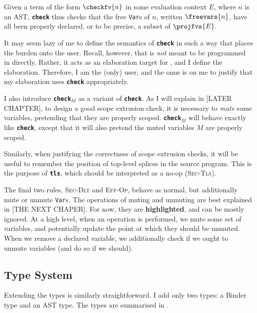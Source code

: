 Given a term of the form $\checkfv{n}$ in some evaluation context $E$, where $n$ is an AST, \textbf{\texttt{check}} thus checks that the free \texttt{Var}s of $n$, written $\freevars{n}$, have all been properly declared, or to be precise, a subset of $\projfvs{E}$. 

It may seem lazy of me to define the semantics of \textbf{\texttt{check}} in such a way that places the burden onto the user. Recall, however, that \coreLang{} is \textit{not} meant to be programmed in directly. Rather, it acts as an elaboration target for \sourceLang{}, and I define the elaboration. Therefore, I am the (only) \coreLang{} user, and the onus is on me to justify that my elaboration uses \textbf{\texttt{check}} appropriately. 

I also introduce \textbf{\texttt{check}}$_M$ as a variant of \textbf{\texttt{check}}. As I will explain in [LATER CHAPTER], to design a good scope extrusion check, it is necessary to \textit{mute} some variables, pretending that they are properly scoped. \textbf{\texttt{check}}$_M$ will behave exactly like \textbf{\texttt{check}}, except that it will also pretend the muted variables $M$ are properly scoped.

Similarly, when justifying the correctness of scope extrusion checks, it will be useful to remember the position of top-level splices in the \sourceLang{} source program. This is the purpose of \textbf{\texttt{tls}}, which should be interpreted as a no-op (\textsc{Sec-Tls}).

The final two rules, \textsc{Sec-Dlt} and \textsc{Eff-Op}, behave as normal, but additionally mute or unmute \texttt{Var}s. The operations of muting and unmuting are best explained in [THE NEXT CHAPER]. For now, they are \textbf{\textcolor{coreHighlight}{highlighted}}, and can be mostly ignored. At a high level, when an operation is performed, we mute some set of variables, and potentially update the point at which they should be unmuted. When we remove a declared variable, we additionally check if we ought to unmute variables (and do so if we should).

\subsection{Type System}
Extending the types is similarly straightforward. I add only two types: a \textsf{Binder} type and an \textsf{AST} type. The types are summarised in .

